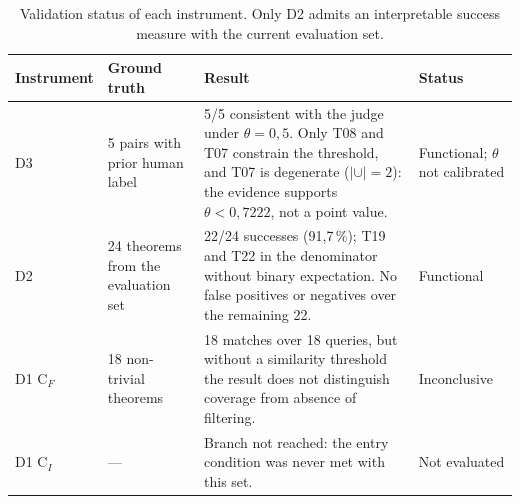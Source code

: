 \begin{table}[htbp]
\centering
\small
\setlength{\tabcolsep}{4pt}
\renewcommand{\arraystretch}{1.15}
\begin{tabular}{p{1.9cm}p{2.6cm}p{6.4cm}p{3.4cm}}
\toprule
Instrument & Ground truth & Result & Status \\
\midrule
D3 &
5 pairs with prior human label &
5/5 consistent with the judge under $\theta = 0{,}5$. Only T08 and T07 constrain the threshold, and T07 is degenerate ($|\cup| = 2$): the evidence supports $\theta < 0{,}7222$, not a point value. &
Functional; $\theta$ not calibrated \\
\addlinespace
D2 &
24 theorems from the evaluation set &
22/24 successes (91{,}7\,\%); T19 and T22 in the denominator without binary expectation. No false positives or negatives over the remaining 22. &
Functional \\
\addlinespace
D1 C$_F$ &
18 non-trivial theorems &
18 matches over 18 queries, but without a similarity threshold the result does not distinguish coverage from absence of filtering. &
Inconclusive \\
\addlinespace
D1 C$_I$ &
--- &
Branch not reached: the entry condition was never met with this set. &
Not evaluated \\
\bottomrule
\end{tabular}
\caption{Validation status of each instrument. Only D2 admits an interpretable success measure with the current evaluation set.}
\label{tab:instrumentos}
\end{table}